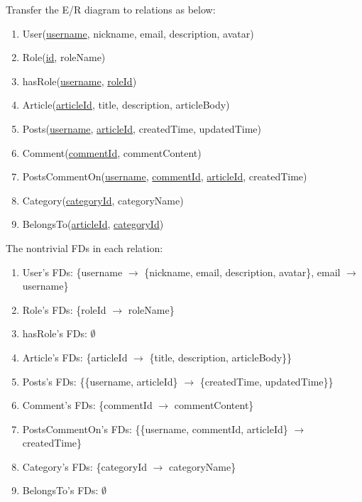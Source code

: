 \documentclass[11pt]{homework}
\begin{document}

  Transfer the E/R diagram to relations as below:
  \begin{enumerate}
    \item User(\underline{username}, nickname, email, description, avatar)
    \item Role(\underline{id}, roleName)
    \item hasRole(\underline{username}, \underline{roleId})
    \item Article(\underline{articleId}, title, description, articleBody)
    \item Posts(\underline{username}, \underline{articleId}, createdTime, updatedTime)
    \item Comment(\underline{commentId}, commentContent)
    \item PostsCommentOn(\underline{username}, \underline{commentId}, \underline{articleId}, createdTime)
    \item Category(\underline{categoryId}, categoryName)
    \item BelongsTo(\underline{articleId}, \underline{categoryId})
  \end{enumerate}

  The nontrivial FDs in each relation:
  \begin{enumerate}
    \item User's FDs: \{username $\rightarrow$ \{nickname, email, description, avatar\}, email $\rightarrow$ username\}
    \item Role's FDs: \{roleId $\rightarrow$ roleName\}
    \item hasRole's FDs: $\emptyset$
    \item Article's FDs: \{articleId $\rightarrow$ \{title, description, articleBody\}\}
    \item Posts's FDs: \{\{username, articleId\} $\rightarrow$ \{createdTime, updatedTime\}\}
    \item Comment's FDs: \{commentId $\rightarrow$ commentContent\}
    \item PostsCommentOn's FDs: \{\{username, commentId, articleId\} $\rightarrow$ createdTime\}
    \item Category's FDs: \{categoryId $\rightarrow$ categoryName\}
    \item BelongsTo's FDs: $\emptyset$
  \end{enumerate}
\end{document}
